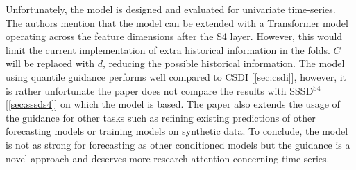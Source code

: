 Unfortunately, the model is designed and evaluated for univariate time-series. The authors mention that the model can be extended with a Transformer \cite{vaswani_attention_2017} model operating across the feature dimensions after the S4 layer. However, this would limit the current implementation of extra historical information in the folds. $C$ will be replaced with $d$, reducing the possible historical information. The model using quantile guidance performs well compared to CSDI [\ref{sec:csdi}], however, it is rather unfortunate the paper does not compare the results with SSSD$^{\text{S4}}$ [\ref{sec:sssds4}] on which the model is based. The paper also extends the usage of the guidance for other tasks such as refining existing predictions of other forecasting models or training models on synthetic data. To conclude, the model is not as strong for forecasting as other conditioned models but the guidance is a novel approach and deserves more research attention concerning time-series.